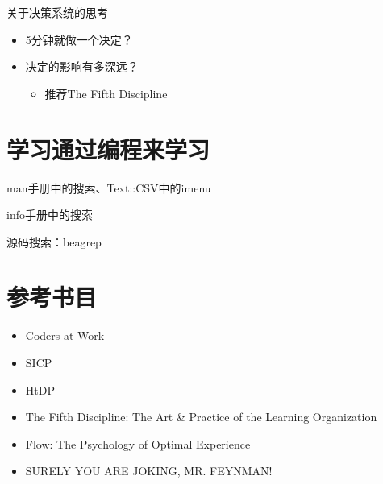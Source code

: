 \documentclass[presentation,dvipdfmx,CJKbookmarks]{beamer}
\begin{document}
\begin{CJK*}{UTF8}{simsun}
\begin{frame}[label={sec:orgfd12273}]{关于决策系统的思考}
\begin{itemize}
\item 5\thinspace 分钟就做一个决定？
\item 决定的影响有多深远？
\begin{itemize}
\item 推荐\thinspace The Fifth Discipline
\end{itemize}
\end{itemize}
\end{frame}

\section{学习通过编程来学习}
\label{sec:orged009e2}

\begin{frame}[label={sec:orgd473c3e}]{}
\begin{block}{man\thinspace 手册中的搜索、Text::CSV\thinspace 中的\thinspace imenu}
\end{block}
\begin{block}{info\thinspace 手册中的搜索}
\end{block}
\begin{block}{源码搜索：beagrep}
\end{block}
\end{frame}

\section{参考书目}
\label{sec:orgbe5dbeb}

\begin{frame}[label={sec:org3faf653}]{}
\begin{itemize}
\item Coders at Work
\item SICP
\item HtDP
\item The Fifth Discipline: The Art \& Practice of the Learning Organization
\item Flow: The Psychology of Optimal Experience
\item SURELY YOU ARE JOKING, MR. FEYNMAN!
\end{itemize}
\end{frame}
\end{CJK*}
\end{document}
